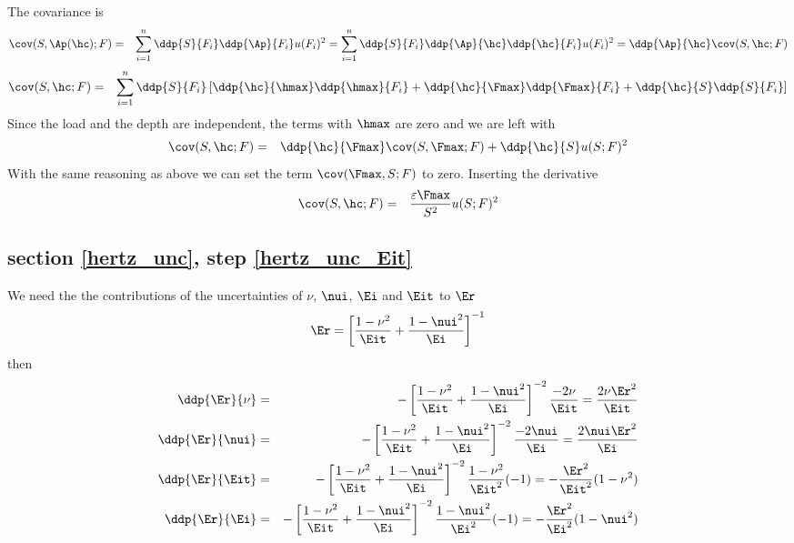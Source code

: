 The covariance is
\begin{eqnarray*}
 \cov(S,\Ap(\hc);F) & =& \sum_{i=1}^n \ddp{ S}{ F_i} \ddp{ \Ap}{ F_i} u(F_i)^2 =  \sum_{i=1}^n \ddp{ S}{ F_i} \ddp{ \Ap}{ \hc} \ddp{\hc}{F_i} u(F_i)^2 =
 \ddp{\Ap}{\hc} \cov(S,\hc;F)
 \end{eqnarray*}
 \begin{eqnarray*}
\cov(S,\hc;F)  &=& \sum_{i=1}^n
  \ddp{ S }{ F_i} 
  \left[
  \ddp{ \hc }{\hmax} \ddp{ \hmax}{ F_i} + 
  \ddp{ \hc }{\Fmax} \ddp{ \Fmax}{ F_i} + 
  \ddp{ \hc }{ S} \ddp{ S}{ F_i} 
  \right]
  \end{eqnarray*}
  Since the load and the depth are independent, the terms with $\hmax$ are zero and we are left with
  \begin{eqnarray*}
  \cov(S,\hc;F) &=& \ddp{ \hc }{ \Fmax} \cov(S,\Fmax; F) +
  \ddp{\hc}{S} u(S;F)^2 
  \end{eqnarray*}
With the same reasoning as above we can set the term $\cov(\Fmax,S;F)$ to zero. Inserting the derivative
 \begin{eqnarray*}
  \cov(S,\hc;F) 
    &=& \frac{\varepsilon \Fmax}{S^2} u(S;F)^2 
   \end{eqnarray*}
   
\subsection{section \ref{hertz_unc}, step \ref{hertz_unc_Eit}}
We need the the contributions of the uncertainties of $\nu$, $\nui$, $\Ei$ and $\Eit$ to $\Er$
\begin{equation}
\Er = \left[ \frac{1-\nu^2}{\Eit} + \frac{1-\nui^2}{\Ei} \right]^{-1}
\end{equation}
then
\begin{eqnarray*}
 \ddp{\Er}{\nu} &=& -\left[ \frac{1-\nu^2}{\Eit} + \frac{1-\nui^2}{\Ei} \right]^{-2} \frac{-2\nu}{\Eit} = \frac{2 \nu \Er^2}{\Eit} \\
 \ddp{\Er}{\nui} &=& -\left[ \frac{1-\nu^2}{\Eit} + \frac{1-\nui^2}{\Ei} \right]^{-2} \frac{-2\nui}{\Ei} = \frac{2 \nui \Er^2}{\Ei} \\
 \ddp{\Er}{\Eit} &=& -\left[ \frac{1-\nu^2}{\Eit} + \frac{1-\nui^2}{\Ei} \right]^{-2} \frac{1-\nu^2}{\Eit^2} (-1) = - \frac{\Er^2}{\Eit^2} ( 1-\nu^2) \\
 \ddp{\Er}{\Ei} &=& -\left[ \frac{1-\nu^2}{\Eit} + \frac{1-\nui^2}{\Ei} \right]^{-2} \frac{1-\nui^2}{\Ei^2} (-1) = - \frac{\Er^2}{\Ei^2} ( 1-\nui^2) \\
 \end{eqnarray*}

